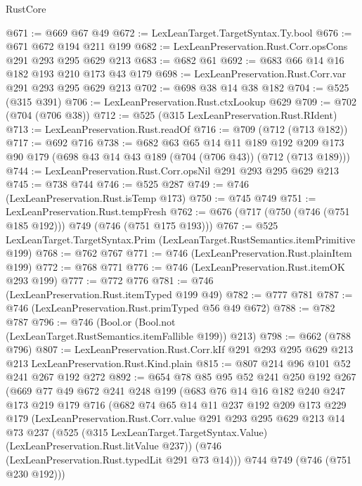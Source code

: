 \begin{lexlean}{RustCore}
\begin{coremodule}
@671 := @669 @67 @49
@672 := LexLeanTarget.TargetSyntax.Ty.bool
@676 := @671 @672 @194 @211 @199
@682 := LexLeanPreservation.Rust.Corr.opsCons @291 @293 @295 @629 @213
@683 := @682 @61
@692 := @683 @66 @14 @16 @182 @193 @210 @173 @43 @179
@698 := LexLeanPreservation.Rust.Corr.var @291 @293 @295 @629 @213
@702 := @698 @38 @14 @38 @182
@704 := @525 (@315 @391)
@706 := LexLeanPreservation.Rust.ctxLookup @629
@709 := @702 (@704 (@706 @38))
@712 := @525 (@315 LexLeanPreservation.Rust.RIdent)
@713 := LexLeanPreservation.Rust.readOf
@716 := @709 (@712 (@713 @182))
@717 := @692 @716
@738 := @682
    @63
    @65
    @14
    @11
    @189
    @192
    @209
    @173
    @90
    @179
    (@698 @43 @14 @43 @189 (@704 (@706 @43)) (@712 (@713 @189)))
@744 := LexLeanPreservation.Rust.Corr.opsNil @291 @293 @295 @629 @213
@745 := @738 @744
@746 := @525 @287
@749 := @746 (LexLeanPreservation.Rust.isTemp @173)
@750 := @745 @749
@751 := LexLeanPreservation.Rust.tempFresh
@762 := @676 (@717 (@750 (@746 (@751 @185 @192))) @749 (@746 (@751 @175 @193)))
@767 := @525 LexLeanTarget.TargetSyntax.Prim (LexLeanTarget.RustSemantics.itemPrimitive @199)
@768 := @762 @767
@771 := @746 (LexLeanPreservation.Rust.plainItem @199)
@772 := @768 @771
@776 := @746 (LexLeanPreservation.Rust.itemOK @293 @199)
@777 := @772 @776
@781 := @746 (LexLeanPreservation.Rust.itemTyped @199 @49)
@782 := @777 @781
@787 := @746 (LexLeanPreservation.Rust.primTyped @56 @49 @672)
@788 := @782 @787
@796 := @746 (Bool.or (Bool.not (LexLeanTarget.RustSemantics.itemFallible @199)) @213)
@798 := @662 (@788 @796)
@807 := LexLeanPreservation.Rust.Corr.kIf
    @291
    @293
    @295
    @629
    @213
    @213
    LexLeanPreservation.Rust.Kind.plain
@815 := @807 @214 @96 @101 @52 @241 @267 @192 @272
@892 := @654
    @78
    @85
    @95
    @52
    @241
    @250
    @192
    @267
    (@669
      @77
      @49
      @672
      @241
      @248
      @199
      (@683
        @76
        @14
        @16
        @182
        @240
        @247
        @173
        @219
        @179
        @716
        (@682
          @74
          @65
          @14
          @11
          @237
          @192
          @209
          @173
          @229
          @179
          (LexLeanPreservation.Rust.Corr.value
            @291
            @293
            @295
            @629
            @213
            @14
            @73
            @237
            (@525 (@315 LexLeanTarget.TargetSyntax.Value) (LexLeanPreservation.Rust.litValue @237))
            (@746 (LexLeanPreservation.Rust.typedLit @291 @73 @14)))
          @744
          @749
          (@746 (@751 @230 @192)))

\end{coremodule}
\end{lexlean}

